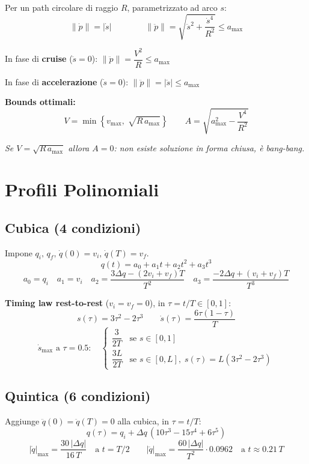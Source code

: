 \documentclass[10pt,a4paper]{article}
\newcommand{\dt}{\dot{s}}
\newcommand{\ddt}{\ddot{s}}
\begin{document}
\begin{greenbox}
Per un path circolare di raggio $R$, parametrizzato ad arco $s$:
\[
\|\dot{p}\| = |\dt| \qquad\qquad
\|\ddot{p}\| = \sqrt{\ddt^2 + \frac{\dt^4}{R^2}} \leq a_{\max}
\]

In fase di \textbf{cruise} ($\ddt = 0$): \quad $\|\ddot{p}\| = \dfrac{V^2}{R} \leq a_{\max}$

In fase di \textbf{accelerazione} ($\dt = 0$): \quad $\|\ddot{p}\| = |\ddt| \leq a_{\max}$

\medskip
\textbf{Bounds ottimali:}
\[
V = \min\!\left\{v_{\max},\; \sqrt{R\,a_{\max}}\right\}
\qquad
A = \sqrt{a_{\max}^2 - \frac{V^4}{R^2}}
\]

\textit{Se $V = \sqrt{R\,a_{\max}}$ allora $A = 0$: non esiste soluzione in forma chiusa, \`e bang-bang.}
\end{greenbox}

\section{Profili Polinomiali}

\subsection{Cubica (4 condizioni)}

Impone $q_i,\, q_f,\, \dot{q}(0) = v_i,\, \dot{q}(T) = v_f$.
\[
q(t) = a_0 + a_1 t + a_2 t^2 + a_3 t^3
\]
\[
a_0 = q_i \quad a_1 = v_i \quad
a_2 = \frac{3\Delta q - (2v_i + v_f)T}{T^2} \quad
a_3 = \frac{-2\Delta q + (v_i + v_f)T}{T^3}
\]

\textbf{Timing law rest-to-rest} ($v_i = v_f = 0$), in $\tau = t/T \in [0,1]$:
\[
s(\tau) = 3\tau^2 - 2\tau^3 \qquad \dot{s}(\tau) = \frac{6\tau(1-\tau)}{T}
\]
\[
\dot{s}_{\max} \text{ a } \tau=0.5:\quad
\begin{cases}
\dfrac{3}{2T} & \text{se } s\in[0,1] \\[6pt]
\dfrac{3L}{2T} & \text{se } s\in[0,L],\; s(\tau)=L(3\tau^2-2\tau^3)
\end{cases}
\]

\subsection{Quintica (6 condizioni)}

Aggiunge $\ddot{q}(0) = \ddot{q}(T) = 0$ alla cubica, in $\tau = t/T$:
\[
q(\tau) = q_i + \Delta q\,(10\tau^3 - 15\tau^4 + 6\tau^5)
\]
\[
|\dot{q}|_{\max} = \frac{30\,|\Delta q|}{16\,T} \quad \text{a } t = T/2
\qquad
|\ddot{q}|_{\max} = \frac{60\,|\Delta q|}{T^2}\cdot 0.0962 \quad \text{a } t \approx 0.21\,T
\]
\end{document}

